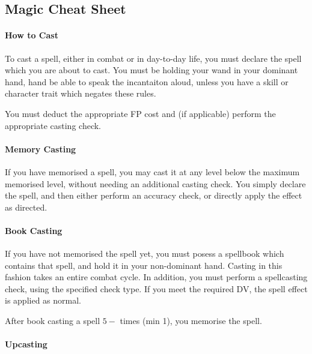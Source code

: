 \onecolumn
\begin{landscape}
\small
\chapter{\vspace{-1ex}Magic Cheat Sheet}
\begin{multicols}{3}
\def\xS{1.8}
\def\wS{2}


\subsubsection{How to Cast}

To cast a spell, either in combat or in day-to-day life, you must declare the spell which you are about to cast. You must be holding your wand in your dominant hand, hand be able to speak the incantaiton aloud, unless you have a skill or character trait which negates these rules.	

You must deduct the appropriate FP cost and (if applicable) perform the appropriate casting check. 

\subsubsection{Memory Casting}

If you have memorised a spell, you may cast it at any level below the maximum memorised level, without needing an additional casting check. You simply declare the spell, and then either perform an accuracy check, or directly apply the effect as directed. 

\subsubsection{Book Casting}

If you have not memorised the spell yet, you must posess a spellbook which contains that spell, and hold it in your non-dominant hand. Casting in this fashion takes an entire combat cycle. In addition, you must perform a spellcasting check, using the specified check type. If you meet the required DV, the spell effect is applied as normal. 

After book casting a spell $5 - $\attIntShort{} times (min 1), you memorise the spell. 

\subsubsection{Upcasting}


\end{multicols}
\end{landscape}
